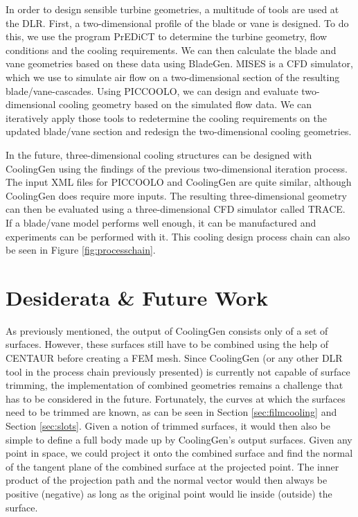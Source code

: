 \documentclass[a4paper, 11pt]{report}
\theoremstyle{definition}
\begin{document}
		In order to design sensible turbine geometries, a multitude of tools are used at the DLR. First, a two-dimensional profile of the blade or vane is designed. To do this, we use the program PrEDiCT to determine the turbine geometry, flow conditions and the cooling requirements. We can then calculate the blade and vane geometries based on these data using BladeGen. MISES is a CFD simulator, which we use to simulate air flow on a two-dimensional section of the resulting blade/vane-cascades. Using PICCOOLO, we can design and evaluate two-dimensional cooling geometry based on the simulated flow data. We can iteratively apply those tools to redetermine the cooling requirements on the updated blade/vane section and redesign the two-dimensional cooling geometries.

		In the future, three-dimensional cooling structures can be designed with CoolingGen using the findings of the previous two-dimensional iteration process. The input XML files for PICCOOLO and CoolingGen are quite similar, although CoolingGen does require more inputs. The resulting three-dimensional geometry can then be evaluated using a three-dimensional CFD simulator called TRACE. If a blade/vane model performs well enough, it can be manufactured and experiments can be performed with it. This cooling design process chain can also be seen in Figure \ref{fig:processchain}.

	\section{Desiderata \& Future Work}
		As previously mentioned, the output of CoolingGen consists only of a set of surfaces. However, these surfaces still have to be combined using the help of CENTAUR before creating a FEM mesh. Since CoolingGen (or any other DLR tool in the process chain previously presented) is currently not capable of surface trimming, the implementation of combined geometries remains a challenge that has to be considered in the future. Fortunately, the curves at which the surfaces need to be trimmed are known, as can be seen in Section \ref{sec:filmcooling} and Section \ref{sec:slots}. Given a notion of trimmed surfaces, it would then also be simple to define a full body made up by CoolingGen's output surfaces. Given any point in space, we could project it onto the combined surface and find the normal of the tangent plane of the combined surface at the projected point. The inner product of the projection path and the normal vector would then always be positive (negative) as long as the original point would lie inside (outside) the surface.
\end{document}
